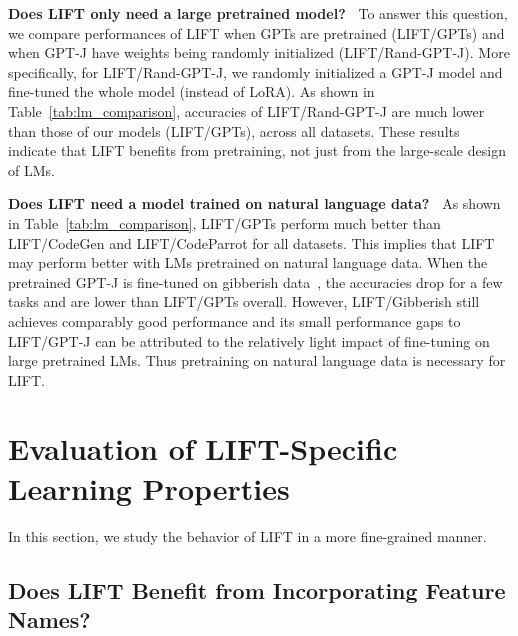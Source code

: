 \textbf{Does LIFT only need a large pretrained model?~} To answer this question, we compare performances of \textsc{LIFT} when GPTs are pretrained (\textsc{LIFT}/GPTs) and when GPT-J have weights being randomly initialized (\textsc{LIFT}/Rand-GPT-J).
More specifically, for \textsc{LIFT}/Rand-GPT-J,  we randomly initialized a GPT-J model and fine-tuned the whole model (instead of LoRA). As shown in Table~\ref{tab:lm_comparison}, accuracies of \textsc{LIFT}/Rand-GPT-J are much lower than those of our models (\textsc{LIFT}/GPTs), across all datasets. These results indicate that \textsc{LIFT} benefits from pretraining, not just from the large-scale design of LMs.

\textbf{Does LIFT need a model trained on natural language data?~} As shown in Table~\ref{tab:lm_comparison}, \textsc{LIFT}/GPTs perform much better than \textsc{LIFT}/CodeGen and \textsc{LIFT}/CodeParrot for all datasets. This implies that \textsc{LIFT} may perform better with LMs pretrained on natural language data. When the pretrained GPT-J is fine-tuned on gibberish data~\citep{gibberish}, the accuracies drop for a few tasks and are lower than \textsc{LIFT}/GPTs overall. However, \textsc{LIFT}/Gibberish still achieves comparably good performance and its small performance gaps to \textsc{LIFT}/GPT-J can be attributed to the relatively light impact of fine-tuning on large pretrained LMs. Thus pretraining on natural language data is necessary for \textsc{LIFT}.

\section{Evaluation of \textsc{LIFT}-Specific Learning Properties}
\label{sec:lift_specific}

In this section, we study the behavior of \textsc{LIFT} in a more fine-grained manner. 

\subsection{Does \textsc{LIFT} Benefit from Incorporating Feature Names?}\label{sec:feature_names}

